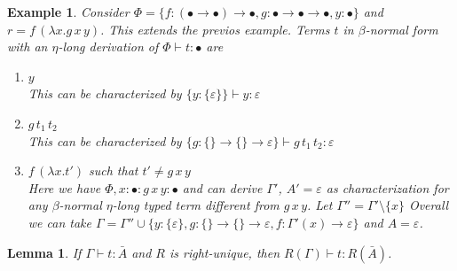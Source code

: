 \documentclass[10pt,a4paper]{article}
\theoremstyle{plain}%
\newtheorem{lemma}[theorem]{Lemma}
\newtheorem{example}[theorem]{Example}
\begin{document}
\begin{example}
Consider $\Phi = \{f : (\bullet \to \bullet) \to \bullet, g : \bullet \to \bullet \to \bullet, y : \bullet\}$ and $r = f\,(\lambda x.g\,x\,y)$.
This extends the previos example.
Terms $t$ in $\beta$-normal form with an $\eta$-long derivation of $\Phi \vdash t : \bullet$ are
\begin{enumerate}
\item $y$\\
This can be characterized by $\{y : \{\varepsilon\}\} \vdash y : \varepsilon$
\item $g\,t_1\,t_2$\\
This can be characterized by $\{g : \{\} \to \{\} \to \varepsilon \} \vdash g\,t_1\,t_2 : \varepsilon$
\item $f\,(\lambda x.t')$ such that $t' \neq g\,x\,y$\\
Here we have $\Phi, x : \bullet : g\,x\,y : \bullet$ and can derive $\Gamma'$, $A' = \varepsilon$ as characterization for any $\beta$-normal $\eta$-long typed term different from $g\,x\,y$.
Let $\Gamma'' = \Gamma' \setminus \{x\}$
Overall we can take $\Gamma = \Gamma'' \cup \{y : \{\varepsilon\}, g : \{\} \to \{\} \to \varepsilon, f : \Gamma'(x) \to \varepsilon\}$ and $A = \varepsilon$.
\end{enumerate}
\end{example}

\begin{lemma}
\label{lem:transform}
If $\Gamma \vdash t : \bar{A}$ and $R$ is right-unique, then $R(\Gamma) \vdash t : R(\bar{A})$.
\end{lemma}


\newpage

%
%
\end{document}
